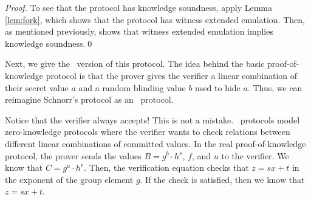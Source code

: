 \begin{proof}
To see that the protocol has knowledge soundness, apply Lemma \ref{lem:fork}, which shows that the protocol has witness extended emulation. Then, as mentioned previously,  \cite{dissertation} shows that witness extended emulation implies knowledge soundness.\qed
%
%
\end{proof}

Next, we give the \ILC\ version of this protocol. The idea behind the basic proof-of-knowledge protocol is that the prover gives the verifier a linear combination of their secret value $a$ and a random blinding value $b$ used to hide $a$. Thus, we can reimagine Schnorr's protocol as an \ILC\ protocol.

Notice that the verifier always accepts! This is not a mistake. \ILC\ protocols model zero-knowledge protocols where the verifier wants to check relations between different linear combinations of committed values. In the real proof-of-knowledge protocol, the prover sends the values $B = g^b \cdot h^s$, $f$, and $u$ to the verifier. We know that $C = g^a \cdot h^r$. Then, the verification equation checks that $z = sx+t$ in the exponent of the group element $g$. If the check is satisfied, then we know that $z = sx+t$.

